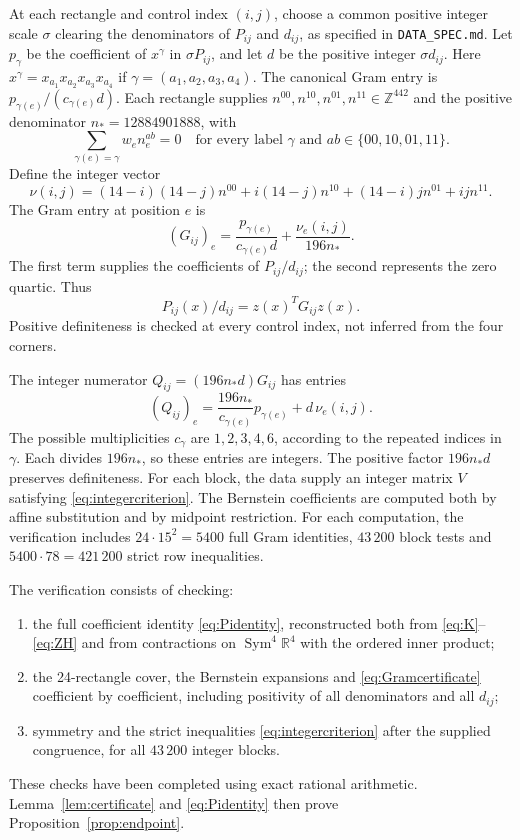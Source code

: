 \documentclass[11pt,a4paper]{amsart}
\numberwithin{equation}{section}
\theoremstyle{definition}
\theoremstyle{remark}
\DeclareMathOperator{\Sym}{Sym}
\newcommand{\R}{\mathbb R}
\begin{document}
At each rectangle and control index $(i,j)$, choose a common positive
integer scale $\sigma$ clearing the denominators of $P_{ij}$ and $d_{ij}$,
as specified in \texttt{DATA\_SPEC.md}. Let $p_\gamma$ be the coefficient
of $x^\gamma$ in $\sigma P_{ij}$, and let $d$ be the positive integer
$\sigma d_{ij}$.
Here $x^\gamma=x_{a_1}x_{a_2}x_{a_3}x_{a_4}$ if
$\gamma=(a_1,a_2,a_3,a_4)$. The canonical Gram entry is
$p_{\gamma(e)}/(c_{\gamma(e)}d)$. Each rectangle supplies
$n^{00},n^{10},n^{01},n^{11}\in\mathbb Z^{442}$ and the positive
denominator $n_*=12884901888$, with
\[
 \sum_{\gamma(e)=\gamma}w_e n_e^{ab}=0
 \quad\text{for every label $\gamma$ and }ab\in\{00,10,01,11\}.
\]
Define the integer vector
\[
 \nu(i,j)=(14-i)(14-j)n^{00}+i(14-j)n^{10}
                +(14-i)j n^{01}+ij n^{11}.
\]
The Gram entry at position $e$ is
\begin{equation}\label{eq:compressedgram}
 (G_{ij})_e=\frac{p_{\gamma(e)}}{c_{\gamma(e)}d}
                     +\frac{\nu_e(i,j)}{196n_*}.
\end{equation}
The first term supplies the coefficients of $P_{ij}/d_{ij}$;
the second represents the zero quartic. Thus
\begin{equation}\label{eq:Gramcertificate}
 P_{ij}(x)/d_{ij}=z(x)^TG_{ij}z(x).
\end{equation}
Positive definiteness is checked at every control index, not inferred
from the four corners.

The integer numerator $Q_{ij}=(196n_*d)G_{ij}$ has entries
\[
 (Q_{ij})_e=\frac{196n_*}{c_{\gamma(e)}}p_{\gamma(e)}
                      +d\,\nu_e(i,j).
\]
The possible multiplicities $c_\gamma$ are $1,2,3,4,6$, according
to the repeated indices in $\gamma$. Each divides $196n_*$, so
these entries are integers.
The positive factor $196n_*d$ preserves definiteness. For each block,
the data supply an integer matrix $V$ satisfying
\eqref{eq:integercriterion}. The Bernstein coefficients are computed
both by affine substitution and by midpoint restriction.
For each computation, the verification includes
$24\cdot15^2=5400$ full Gram identities, $43\,200$ block tests and
$5400\cdot78=421\,200$ strict row inequalities.

The verification consists of checking:
\begin{enumerate}
\item the full coefficient identity \eqref{eq:Pidentity}, reconstructed
both from \eqref{eq:K}--\eqref{eq:ZH} and from contractions on
$\Sym^4\R^4$ with the ordered inner product;
\item the 24-rectangle cover, the Bernstein expansions and
\eqref{eq:Gramcertificate} coefficient by coefficient, including
positivity of all denominators and all $d_{ij}$;
\item symmetry and the strict inequalities \eqref{eq:integercriterion}
after the supplied congruence, for all $43\,200$ integer blocks.
\end{enumerate}
These checks have been completed using exact rational arithmetic.
Lemma~\ref{lem:certificate} and
\eqref{eq:Pidentity} then prove Proposition~\ref{prop:endpoint}.
\end{document}
